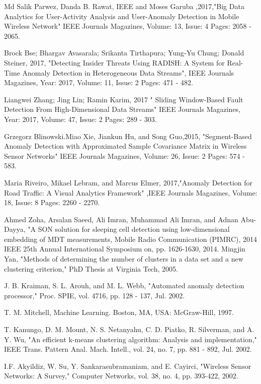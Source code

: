 \documentclass[10pt,a4paper,journal]{IEEEtran}
\begin{document}
 \begin{thebibliography}{5}
 Md Salik Parwez, Danda B. Rawat, IEEE and Moses Garuba ,2017,"Big Data Analytics
for User-Activity Analysis and User-Anomaly Detection in Mobile Wireless Network"
IEEE Journals Magazines, Volume: 13, Issue: 4 Pages: 2058 - 2065.

  Brock Bse; Bhargav Avasarala; Srikanta Tirthapura; Yung-Yu Chung; Donald Steiner,
2017, "Detecting Insider Threats Using RADISH: A System for Real-Time Anomaly
Detection in Heterogeneous Data Streams", IEEE Journals Magazines, Year: 2017,
Volume: 11, Issue: 2 Pages: 471 - 482.

Liangwei Zhang; Jing Lin; Ramin Karim, 2017 " Sliding Window-Based Fault Detection
From High-Dimensional Data Streams" IEEE Journals Magazines, Year: 2017, Volume:
47, Issue: 2 Pages: 289 - 303.

 Grzegorz Blinowski.Miao Xie, Jiankun Hu, and Song Guo,2015, "Segment-Based
Anomaly Detection with Approximated Sample Covariance Matrix in Wireless Sensor
Networks" IEEE Journals Magazines, Volume: 26, Issue: 2 Pages: 574 - 583.

Maria Riveiro, Mikael Lebram, and Marcus Elmer, 2017,"Anomaly Detection for Road
Traffic: A Visual Analytics Framework" ,IEEE Journals Magazines, Volume: 18, Issue:
8 Pages: 2260 - 2270.

Ahmed Zoha, Arsalan Saeed, Ali Imran, Muhammad Ali Imran, and Adnan Abu-Dayya, "A SON solution for sleeping cell detection using low-dimensional embedding of MDT measurements, Mobile Radio Communication (PIMRC), 2014 IEEE 25th Annual International Symposium on, pp. 1626-1630, 2014.
Mingjin Yan, "Methods of determining the number of clusters in a data set and a new clustering criterion," PhD Thesis at Virginia Tech, 2005.

J. B. Kraiman, S. L. Arouh, and M. L. Webb, "Automated anomaly
detection processor," Proc. SPIE, vol. 4716, pp. 128 - 137, Jul. 2002.

T. M. Mitchell, Machine Learning. Boston, MA, USA: McGraw-Hill,
1997.

T. Kanungo, D. M. Mount, N. S. Netanyahu, C. D. Piatko, R. Silverman,
and A. Y. Wu, "An efficient k-means clustering algorithm: Analysis and
implementation," IEEE Trans. Pattern Anal. Mach. Intell., vol. 24, no. 7,
pp. 881 - 892, Jul. 2002.

I.F. Akyildiz, W. Su, Y. Sankarasubramaniam, and E. Cayirci,
"Wireless Sensor Networks: A Survey," Computer Networks,
vol. 38, no. 4, pp. 393-422, 2002.


\end{thebibliography}
\end{document}
